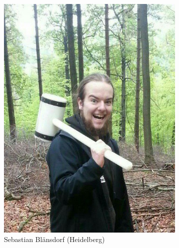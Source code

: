 \documentclass[compress, aspectratio=169]{beamer}
\begin{document}
\begin{frame}
\begin{figure}
\begin{subfigure}[t]{0.24\textwidth}
				\includegraphics[width = \textwidth]{blaensdorf.jpg}
				\caption*{Sebastian Blänsdorf (Heidelberg)}
		\end{subfigure}
			\begin{subfigure}[t]{0.24\textwidth}

\end{subfigure}
\end{figure}
\end{frame}
\end{document}
